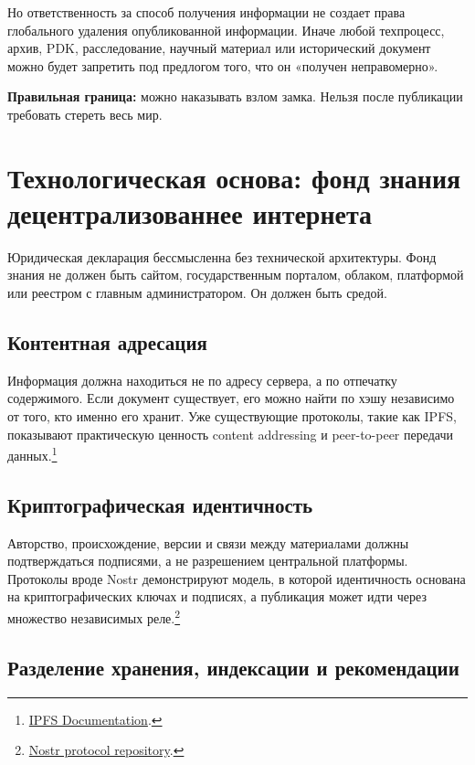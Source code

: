 \documentclass[11pt,a4paper]{article}
\begin{document}
Но ответственность за способ получения информации не создает права глобального удаления опубликованной информации. Иначе любой техпроцесс, архив, PDK, расследование, научный материал или исторический документ можно будет запретить под предлогом того, что он «получен неправомерно».

\begin{executivebox}
\textbf{Правильная граница:} можно наказывать взлом замка. Нельзя после публикации требовать стереть весь мир.
\end{executivebox}

\section{Технологическая основа: фонд знания децентрализованнее интернета}

Юридическая декларация бессмысленна без технической архитектуры. Фонд знания не должен быть сайтом, государственным порталом, облаком, платформой или реестром с главным администратором. Он должен быть средой.

\subsection{Контентная адресация}

Информация должна находиться не по адресу сервера, а по отпечатку содержимого. Если документ существует, его можно найти по хэшу независимо от того, кто именно его хранит. Уже существующие протоколы, такие как IPFS, показывают практическую ценность content addressing и peer-to-peer передачи данных.\footnote{\href{https://docs.ipfs.tech/}{IPFS Documentation}.}

\subsection{Криптографическая идентичность}

Авторство, происхождение, версии и связи между материалами должны подтверждаться подписями, а не разрешением центральной платформы. Протоколы вроде Nostr демонстрируют модель, в которой идентичность основана на криптографических ключах и подписях, а публикация может идти через множество независимых реле.\footnote{\href{https://github.com/nostr-protocol/nostr/}{Nostr protocol repository}.}

\subsection{Разделение хранения, индексации и рекомендации}
\end{document}
